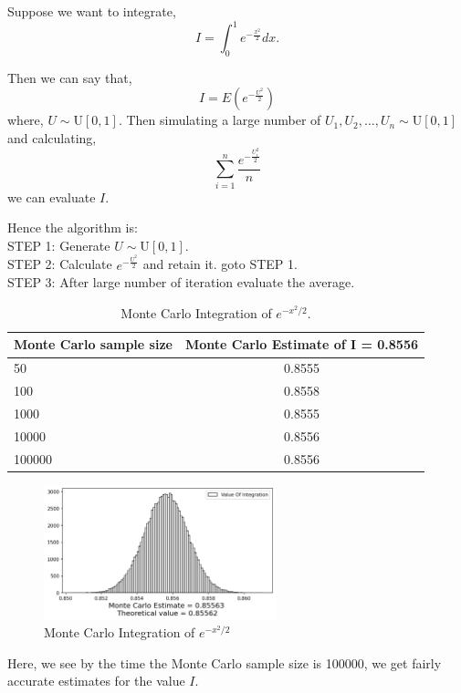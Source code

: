 \begin{example}
	Suppose we want to integrate,
	\[
		I = \int_{0}^{1} e^{-\frac{x ^{2}}{2}} dx.
	\]

	Then we can say that,
	\[
		I = E(e^{-\frac{U ^{2}}{2}})
	\]
    where, $U\sim \text{U}[0,1]$. Then simulating a large number of $U_1, U_2, \ldots, U_n\sim \text{U}[0,1]$ and calculating,
	\[
		\sum_{i = 1}^{n}  \frac{e^{-\frac{U_i ^{2}}{2}}}{n}
	\]
	we can evaluate $I$.

	Hence the algorithm is:\\
    STEP 1: Generate $U\sim \text{U}[0,1]$. \\
	STEP 2: Calculate $ e^{-\frac{U ^{2}}{2}} $ and retain it. goto STEP 1. \\
	STEP 3: After large number of iteration evaluate the average.
	\begin{table}[H]
		\begin{center}
			\begin{tabular}{l c}
				\hline
				Monte Carlo sample size & Monte Carlo Estimate of I = 0.8556 \\
				\hline
				50                      & 0.8555                              \\
				100                     & 0.8558                              \\
				1000                    & 0.8555                              \\
				10000                   & 0.8556                              \\
				100000                  & 0.8556                              \\
				\hline
			\end{tabular}
			\caption{Monte Carlo Integration of $e^{-x ^{2}/2}$.}
		\end{center}
	\end{table}
	\begin{figure}[H]
		\centering
		\includegraphics[width=0.6\textwidth]{images/evaluating_integration.png}
		\caption{Monte Carlo Integration of $e^{-x ^{2}/2} $}
	\end{figure}
	Here, we see by the time the Monte Carlo sample size is 100000, we get fairly
	accurate estimates for the value $I$.
\end{example}


